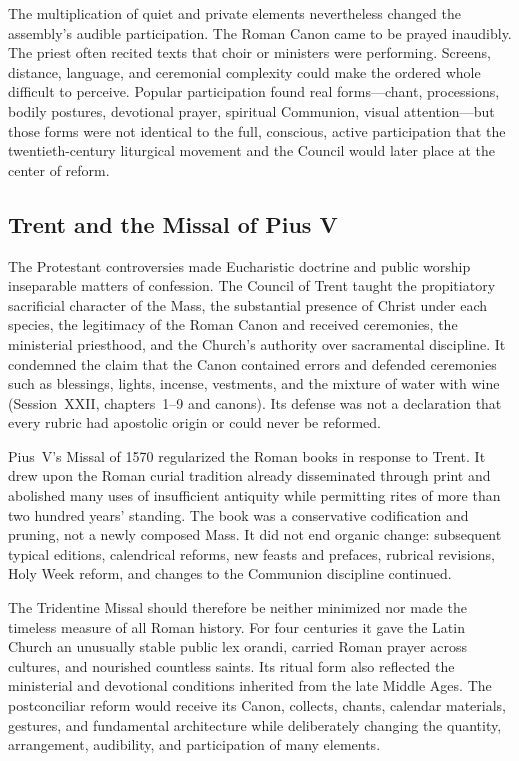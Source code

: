 The multiplication of quiet and private elements nevertheless changed the assembly's audible participation. The Roman Canon came to be prayed inaudibly. The priest often recited texts that choir or ministers were performing. Screens, distance, language, and ceremonial complexity could make the ordered whole difficult to perceive. Popular participation found real forms---chant, processions, bodily postures, devotional prayer, spiritual Communion, visual attention---but those forms were not identical to the full, conscious, active participation that the twentieth-century liturgical movement and the Council would later place at the center of reform.

\subsection{Trent and the Missal of Pius V}

The Protestant controversies made Eucharistic doctrine and public worship inseparable matters of confession. The Council of Trent taught the propitiatory sacrificial character of the Mass, the substantial presence of Christ under each species, the legitimacy of the Roman Canon and received ceremonies, the ministerial priesthood, and the Church's authority over sacramental discipline. It condemned the claim that the Canon contained errors and defended ceremonies such as blessings, lights, incense, vestments, and the mixture of water with wine (Session~XXII, chapters~1--9 and canons). Its defense was not a declaration that every rubric had apostolic origin or could never be reformed.

Pius~V's Missal of 1570 regularized the Roman books in response to Trent. It drew upon the Roman curial tradition already disseminated through print and abolished many uses of insufficient antiquity while permitting rites of more than two hundred years' standing. The book was a conservative codification and pruning, not a newly composed Mass. It did not end organic change: subsequent typical editions, calendrical reforms, new feasts and prefaces, rubrical revisions, Holy Week reform, and changes to the Communion discipline continued.

The Tridentine Missal should therefore be neither minimized nor made the timeless measure of all Roman history. For four centuries it gave the Latin Church an unusually stable public lex orandi, carried Roman prayer across cultures, and nourished countless saints. Its ritual form also reflected the ministerial and devotional conditions inherited from the late Middle Ages. The postconciliar reform would receive its Canon, collects, chants, calendar materials, gestures, and fundamental architecture while deliberately changing the quantity, arrangement, audibility, and participation of many elements.

